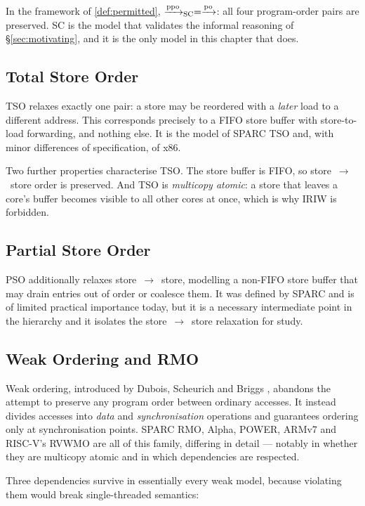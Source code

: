 In the framework of \cref{def:permitted}, $\xrightarrow{\text{ppo}}_{\mathrm{SC}} = \xrightarrow{\text{po}}$: all four
program-order pairs are preserved. SC is the model that validates the informal
reasoning of \S\ref{sec:motivating}, and it is the only model in this chapter
that does.

\subsection{Total Store Order}

TSO relaxes exactly one pair: a store may be reordered with a \emph{later} load to
a different address.
This corresponds precisely to a FIFO store buffer with
store-to-load forwarding, and nothing else.
It is the model of SPARC TSO and,
with minor differences of specification, of x86.

Two further properties characterise TSO. The store buffer is FIFO, so
store~$\to$~store order is preserved. And TSO is \emph{multicopy atomic}: a store
that leaves a core's buffer becomes visible to all other cores at once, which is
why IRIW is forbidden.

\subsection{Partial Store Order}

PSO additionally relaxes store~$\to$~store, modelling a non-FIFO store buffer that
may drain entries out of order or coalesce them.
It was defined by SPARC and is
of limited practical importance today, but it is a necessary intermediate point in
the hierarchy and it isolates the store~$\to$~store relaxation for study.

\subsection{Weak Ordering and RMO}

Weak ordering, introduced by Dubois, Scheurich and Briggs
\cite{dubois1986memory}, abandons the attempt to preserve any program order
between ordinary accesses.
It instead divides accesses into \emph{data} and
\emph{synchronisation} operations and guarantees ordering only at synchronisation
points.
SPARC RMO, Alpha, POWER, ARMv7 and RISC-V's RVWMO are all of this family,
differing in detail --- notably in whether they are multicopy atomic and in which
dependencies are respected.

Three dependencies survive in essentially every weak model, because violating them
would break single-threaded semantics:

